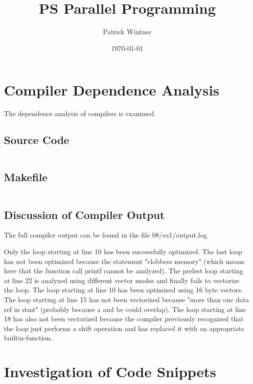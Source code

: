 \documentclass[parskip]{scrartcl}
\title{PS Parallel Programming}
\author{Patrick Wintner}
\date{\today}
\begin{document}
	\maketitle
	
	\section{Compiler Dependence Analysis}
	The dependence analysis of compilers is examined.
	\subsection{Source Code}
	\inputminted	[linenos]{c}{ex1/analysis.c}
	
	\subsection{Makefile}
	\inputminted{make}{ex1/Makefile}
	
	\subsection{Discussion of Compiler Output}
	The full compiler output can be found in the file 08/ex1/output.log.
	
	
	Only the loop starting at line 10 has been successfully optimized. The last loop has not been optimized because the statement "clobbers memory" (which means here that the function call printf cannot be analyzed). The prelest loop starting at line 22 is analyzed using different vector modes and finally fails to vectorize the loop. The loop starting at line 10 has been optimized using 16 byte vectors. The loop starting at line 15 has not been vectorized because "more than one data ref in stmt" (probably because a and be could overlap). The loop starting at line 18 has also not been vectorized because the compiler previously recognized that the loop just performs a shift operation and has replaced it with an appropriate builtin-function.
	
	\section{Investigation of Code Snippets}
\end{document}
